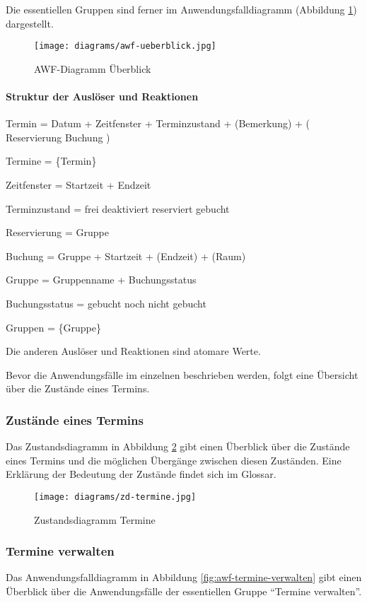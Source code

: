Die essentiellen Gruppen sind ferner im Anwendungsfalldiagramm (Abbildung \ref{fig:awf-ueberblick}) dargestellt.

\begin{figure}
  \centering
  \texttt{[image: diagrams/awf-ueberblick.jpg]}
  \caption{AWF-Diagramm Überblick}
  \label{fig:awf-ueberblick}
\end{figure}

\paragraph{Struktur der Auslöser und Reaktionen}

Termin = Datum + Zeitfenster + Terminzustand + (Bemerkung) + (
Reservierung \textbar{} Buchung )

Termine = \{Termin\}

Zeitfenster = Startzeit + Endzeit

Terminzustand = frei \textbar{} deaktiviert \textbar{} reserviert \textbar{} gebucht

Reservierung = Gruppe

Buchung = Gruppe + Startzeit + (Endzeit) + (Raum)

Gruppe = Gruppenname + Buchungsstatus

Buchungsstatus = gebucht \textbar{} noch nicht gebucht

Gruppen = \{Gruppe\}

Die anderen Auslöser und Reaktionen sind atomare Werte.

Bevor die Anwendungsfälle im einzelnen beschrieben werden, folgt eine Übersicht über die Zustände eines Termins.

\subsubsection{Zustände eines Termins}
Das Zustandsdiagramm in Abbildung \ref{fig:zd-termine} gibt einen Überblick über die Zustände eines Termins und die möglichen Übergänge zwischen diesen Zuständen. Eine Erklärung der Bedeutung der Zustände findet sich im Glossar.
\begin{figure}
  \centering
  \texttt{[image: diagrams/zd-termine.jpg]}
  \caption{Zustandsdiagramm Termine}
  \label{fig:zd-termine}
\end{figure}

\subsubsection{Termine verwalten}
Das Anwendungsfalldiagramm in Abbildung \ref{fig:awf-termine-verwalten} gibt einen Überblick über die Anwendungsfälle der essentiellen Gruppe ``Termine verwalten''.

